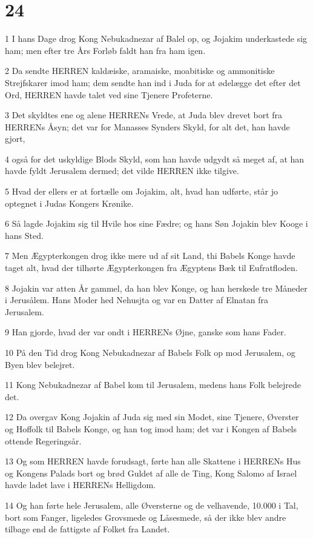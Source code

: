 \chapter{24}

\par 1 I hans Dage drog Kong Nebukadnezar af Balel op, og Jojakim underkastede sig ham; men efter tre Års Forløb faldt han fra ham igen.
\par 2 Da sendte HERREN kaldæiske, aramaiske, moabitiske og ammonitiske Strejfskarer imod ham; dem sendte han ind i Juda for at ødelægge det efter det Ord, HERREN havde talet ved sine Tjenere Profeterne.
\par 3 Det skyldtes ene og alene HERRENs Vrede, at Juda blev drevet bort fra HERRENs Åsyn; det var for Manasses Synders Skyld, for alt det, han havde gjort,
\par 4 også for det uskyldige Blods Skyld, som han havde udgydt så meget af, at han havde fyldt Jerusalem dermed; det vilde HERREN ikke tilgive.
\par 5 Hvad der ellers er at fortælle om Jojakim, alt, hvad han udførte, står jo optegnet i Judas Kongers Krønike.
\par 6 Så lagde Jojakim sig til Hvile hos sine Fædre; og hans Søn Jojakin blev Kooge i hans Sted.
\par 7 Men Ægypterkongen drog ikke mere ud af sit Land, thi Babels Konge havde taget alt, hvad der tilhørte Ægypterkongen fra Ægyptens Bæk til Eufratfloden.
\par 8 Jojakin var atten År gammel, da han blev Konge, og han herskede tre Måneder i Jerusålem. Hans Moder hed Nehusjta og var en Datter af Elnatan fra Jerusalem.
\par 9 Han gjorde, hvad der var ondt i HERRENs Øjne, ganske som hans Fader.
\par 10 På den Tid drog Kong Nebukadnezar af Babels Folk op mod Jerusalem, og Byen blev belejret.
\par 11 Kong Nebukadnezar af Babel kom til Jerusalem, medens hans Folk belejrede det.
\par 12 Da overgav Kong Jojakin af Juda sig med sin Modet, sine Tjenere, Øverster og Hoffolk til Babels Konge, og han tog imod ham; det var i Kongen af Babels ottende Regeringsår.
\par 13 Og som HERREN havde forudsagt, førte han alle Skattene i HERRENs Hus og Kongens Palads bort og brød Guldet af alle de Ting, Kong Salomo af Israel havde ladet lave i HERRENs Helligdom.
\par 14 Og han førte hele Jerusalem, alle Øversterne og de velhavende, 10.000 i Tal, bort som Fanger, ligeledes Grovsmede og Låsesmede, så der ikke blev andre tilbage end de fattigste af Folket fra Landet.
